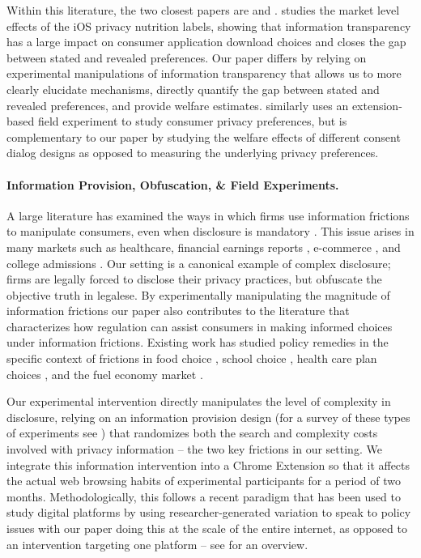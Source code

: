 \documentclass[12pt]{article}
\theoremstyle{definition}
\theoremstyle{remark}
\begin{document}
Within this literature, the two closest papers are \cite{bian2021supply} and \cite{fradkin2024data}. \cite{bian2021supply} studies the market level effects of the iOS privacy nutrition labels, showing that information transparency has a large impact on consumer application download choices and closes the gap between stated and revealed preferences. Our paper differs by relying on experimental manipulations of information transparency that allows us to more clearly elucidate mechanisms, directly quantify the gap between stated and revealed preferences, and provide welfare estimates. \cite{fradkin2024data} similarly uses an extension-based field experiment to study consumer privacy preferences, but is complementary to our paper by studying the welfare effects of different consent dialog designs as opposed to measuring the underlying privacy preferences.

\paragraph{Information Provision, Obfuscation, \& Field Experiments.} A large literature has examined the ways in which firms use information frictions to manipulate consumers, even when disclosure is mandatory \citep{10.1257/jel.48.4.935, doi:10.1287/mnsc.2021.4037}. This issue arises in many markets such as healthcare, financial earnings reports \citep{dehaan2020disclosure}, e-commerce \citep{10.1162/qjec.2010.125.2.859, doi:10.1287/mksc.2020.1261}, and college admissions \citep{LUCA201517}. Our setting is a canonical example of complex disclosure; firms are legally forced to disclose their privacy practices, but obfuscate the objective truth in legalese. By experimentally manipulating the magnitude of information frictions our paper also contributes to the literature that characterizes how regulation can assist consumers in making informed choices under information frictions. Existing work has studied policy remedies in the specific context of frictions in food choice \citep{barahona2023equilibrium}, school choice  \citep{agte2024search}, health care plan choices \citep{handel2015health, brown2024endogenous}, and the fuel economy market \citep{allcott2019consumers}. 

Our experimental intervention directly manipulates the level of complexity in disclosure, relying on an information provision design (for a survey of these types of experiments see \cite{10.1257/jel.20211658}) that randomizes both the search and complexity costs involved with privacy information -- the two key frictions in our setting. We integrate this information intervention into a Chrome Extension so that it affects the actual web browsing habits of experimental participants for a period of two months. Methodologically, this follows a recent paradigm that has been used to study digital platforms by using researcher-generated variation to speak to policy issues with our paper doing this at the scale of the entire internet, as opposed to an intervention targeting one platform \citep{levy2021social, aridor2025measuring, beknazar2022toxic, allcott2025sources, fradkin2024data} -- see \cite{aridor2024Experiments} for an overview.
\end{document}

